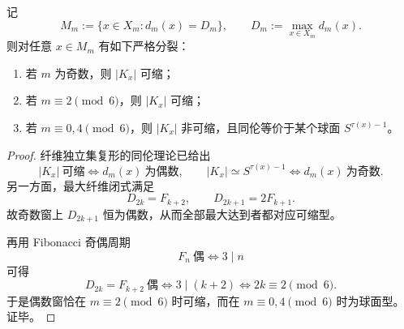 \begin{theorem}[最大纤维同伦型的模 \(6\) 相图]\label{thm:conclusion-maxfiber-mod6-homotopy-phase-diagram}
记
\[
M_m:=\{x\in X_m:d_m(x)=D_m\},
\qquad
D_m:=\max_{x\in X_m}d_m(x).
\]
则对任意 \(x\in M_m\) 有如下严格分裂：
\begin{enumerate}
\normalfont
  \item 若 \(m\) 为奇数，则 \(|K_x|\) 可缩；
  \item 若 \(m\equiv 2\pmod 6\)，则 \(|K_x|\) 可缩；
  \item 若 \(m\equiv 0,4\pmod 6\)，则 \(|K_x|\) 非可缩，且同伦等价于某个球面 \(S^{\tau(x)-1}\)。
\end{enumerate}
\end{theorem}
\begin{proof}
纤维独立集复形的同伦理论已给出
\[
|K_x|\ \text{可缩}
\iff
d_m(x)\ \text{为偶数},
\qquad
|K_x|\simeq S^{\tau(x)-1}
\iff
d_m(x)\ \text{为奇数}.
\]
另一方面，最大纤维闭式满足
\[
D_{2k}=F_{k+2},
\qquad
D_{2k+1}=2F_{k+1}.
\]
故奇数窗上 \(D_{2k+1}\) 恒为偶数，从而全部最大达到者都对应可缩型。

再用 Fibonacci 奇偶周期
\[
F_n\ \text{偶}\iff 3\mid n
\]
可得
\[
D_{2k}=F_{k+2}\ \text{偶}
\iff
3\mid(k+2)
\iff
2k\equiv 2\pmod 6.
\]
于是偶数窗恰在 \(m\equiv 2\pmod 6\) 时可缩，而在 \(m\equiv 0,4\pmod 6\) 时为球面型。证毕。
\end{proof}

